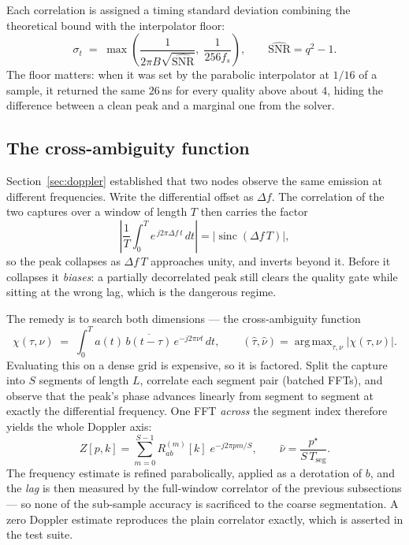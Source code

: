 \documentclass[11pt,a4paper]{article}
\DeclareMathOperator*{\argmax}{arg\,max}
\DeclareMathOperator{\sinc}{sinc}
\begin{document}
Each correlation is assigned a timing standard deviation combining the
theoretical bound with the interpolator floor:
\begin{equation}
  \sigma_t \;=\; \max\!\left(
  \frac{1}{2\pi B\sqrt{\widehat{\text{SNR}}}},\;
  \frac{1}{256 f_s}\right),
  \qquad \widehat{\text{SNR}} = q^{2}-1 .
  \label{eq:sigma}
\end{equation}
The floor matters: when it was set by the parabolic interpolator at $1/16$
of a sample, it returned the same $26$\,ns for every quality above about
$4$, hiding the difference between a clean peak and a marginal one from the
solver.

\subsection{The cross-ambiguity function}
\label{sec:caf}

Section~\ref{sec:doppler} established that two nodes observe the same
emission at different frequencies. Write the differential offset as $\Delta
f$. The correlation of the two captures over a window of length $T$ then
carries the factor
\begin{equation}
  \left|\frac{1}{T}\int_0^T e^{\,j2\pi \Delta f\,t}\,dt\right|
  = \bigl|\sinc(\Delta f\,T)\bigr|,
\end{equation}
so the peak collapses as $\Delta f\,T$ approaches unity, and inverts beyond
it. Before it collapses it \emph{biases}: a partially decorrelated peak
still clears the quality gate while sitting at the wrong lag, which is the
dangerous regime.

The remedy is to search both dimensions --- the cross-ambiguity function
\begin{equation}
  \chi(\tau,\nu) \;=\; \int_0^T a(t)\,\overline{b(t-\tau)}\,
  e^{-j2\pi\nu t}\,dt ,
  \qquad (\hat\tau,\hat\nu) = \argmax_{\tau,\nu} |\chi(\tau,\nu)| .
\end{equation}
Evaluating this on a dense grid is expensive, so it is factored. Split the
capture into $S$ segments of length $L$, correlate each segment pair
(batched FFTs), and observe that the peak's phase advances linearly from
segment to segment at exactly the differential frequency. One FFT
\emph{across} the segment index therefore yields the whole Doppler axis:
\begin{equation}
  Z[p,k] = \sum_{m=0}^{S-1} R^{(m)}_{ab}[k]\;e^{-j2\pi pm/S},
  \qquad \hat\nu = \frac{p^\star}{S\,T_{\text{seg}}} .
\end{equation}
The frequency estimate is refined parabolically, applied as a derotation of
$b$, and the \emph{lag} is then measured by the full-window correlator of the
previous subsections --- so none of the sub-sample accuracy is sacrificed to
the coarse segmentation. A zero Doppler estimate reproduces the plain
correlator exactly, which is asserted in the test suite.
\end{document}
